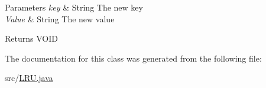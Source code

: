 \begin{DoxyParams}{Parameters}
{\em key} & String The new key \\
\hline
{\em Value} & String The new value \\
\hline
\end{DoxyParams}
\begin{DoxyReturn}{Returns}
V\+O\+I\+D 
\end{DoxyReturn}


The documentation for this class was generated from the following file\+:\begin{DoxyCompactItemize}
\item 
src/\hyperlink{_l_r_u_8java}{L\+R\+U.\+java}\end{DoxyCompactItemize}
